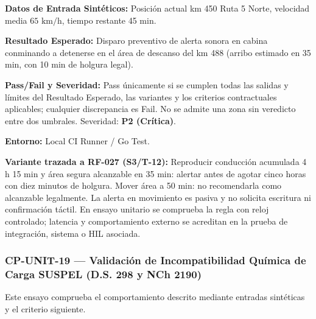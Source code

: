 \par\noindent\textbf{Datos de Entrada Sintéticos:} Posición actual km 450 Ruta 5 Norte, velocidad media \(65\text{ km/h}\), tiempo restante 45 min.\par
\par\noindent\textbf{Resultado Esperado:} Disparo preventivo de alerta sonora en cabina conminando a detenerse en el área de descanso del km 488 (arribo estimado en 35 min, con 10 min de holgura legal).\par
\par\noindent\textbf{Pass/Fail y Severidad:} Pass únicamente si se cumplen todas las salidas y límites del Resultado Esperado, las variantes y los criterios contractuales aplicables; cualquier discrepancia es Fail. No se admite una zona sin veredicto entre dos umbrales. Severidad: \textbf{P2 (Crítica)}.\par
\par\noindent\textbf{Entorno:} Local CI Runner / Go Test.\par







\par\noindent\textbf{Variante trazada a RF-027 (S3/T-12):} Reproducir conducción acumulada 4 h 15 min y área segura alcanzable en 35 min: alertar antes de agotar cinco horas con diez minutos de holgura. Mover área a 50 min: no recomendarla como alcanzable legalmente. La alerta en movimiento es pasiva y no solicita escritura ni confirmación táctil. En ensayo unitario se comprueba la regla con reloj controlado; latencia y comportamiento externo se acreditan en la prueba de integración, sistema o HIL asociada.\par
\subsubsection*{CP-UNIT-19 — Validación de Incompatibilidad Química de Carga SUSPEL (D.S. 298 y NCh 2190)}\label{sec:9-cp-unit-19}
Este ensayo comprueba el comportamiento descrito mediante entradas sintéticas y el criterio siguiente.

